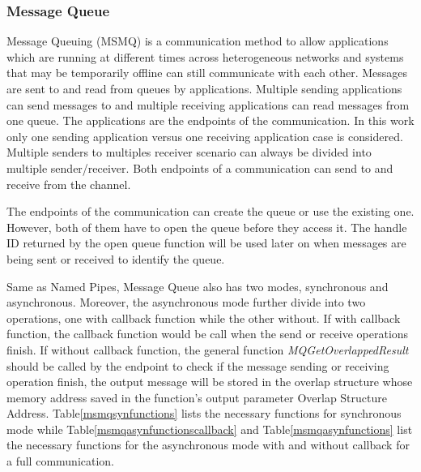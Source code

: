 \subsubsection{Message Queue }
Message Queuing (MSMQ) is a communication method to allow applications which are running at different times across heterogeneous networks and systems that may be temporarily offline can still communicate with each other. Messages are sent to and read from queues by applications. Multiple sending applications can send messages to and multiple receiving applications can read messages from one queue. \cite{redkar2004pro} The applications are the endpoints of the communication. In this work only one sending application versus one receiving application case is considered. Multiple senders to multiples receiver scenario can always be divided into multiple sender/receiver. Both endpoints of a communication can send to and receive from the channel.

The endpoints of the communication can create the queue or use the existing one. However, both of them have to open the queue before they access it. The handle ID returned by the open queue function will be used later on when messages are being sent or received to identify the queue.

Same as Named Pipes, Message Queue also has two modes, synchronous and asynchronous. Moreover, the asynchronous mode further divide into two operations, one with callback function while the other without. If with callback function, the callback function would be call when the send or receive operations finish. If without callback function, the general function \textit{MQGetOverlappedResult} should be called by the endpoint to check if the message sending or receiving operation finish, the output message will be stored in the overlap structure whose memory address saved in the function's output parameter Overlap Structure Address. Table\ref{msmqsynfunctions} lists the necessary functions for synchronous mode while Table\ref{msmqasynfunctionscallback} and Table\ref{msmqasynfunctions} list the necessary functions for the asynchronous mode with and without callback for a full communication. 

